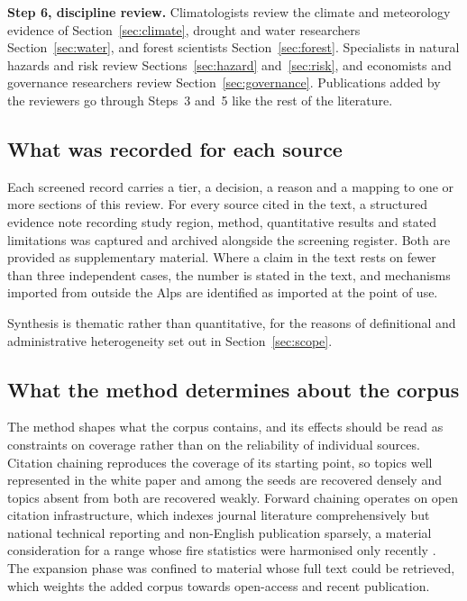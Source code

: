 \documentclass[11pt,a4paper]{article}
\begin{document}
\textbf{Step 6, discipline review.} Climatologists review the climate and meteorology evidence of Section~\ref{sec:climate}, drought and water researchers Section~\ref{sec:water}, and forest scientists Section~\ref{sec:forest}. Specialists in natural hazards and risk review Sections~\ref{sec:hazard} and~\ref{sec:risk}, and economists and governance researchers review Section~\ref{sec:governance}. Publications added by the reviewers go through Steps~3 and~5 like the rest of the literature.

\subsection{What was recorded for each source}
\label{app:recorded}

Each screened record carries a tier, a decision, a reason and a mapping to one or more sections of this review. For every source cited in the text, a structured evidence note recording study region, method, quantitative results and stated limitations was captured and archived alongside the screening register. Both are provided as supplementary material. Where a claim in the text rests on fewer than three independent cases, the number is stated in the text, and mechanisms imported from outside the Alps are identified as imported at the point of use.

Synthesis is thematic rather than quantitative, for the reasons of definitional and administrative heterogeneity set out in Section~\ref{sec:scope}.

\subsection{What the method determines about the corpus}

The method shapes what the corpus contains, and its effects should be read as constraints on coverage rather than on the reliability of individual sources. Citation chaining reproduces the coverage of its starting point, so topics well represented in the white paper and among the seeds are recovered densely and topics absent from both are recovered weakly. Forward chaining operates on open citation infrastructure, which indexes journal literature comprehensively but national technical reporting and non-English publication sparsely, a material consideration for a range whose fire statistics were harmonised only recently \citep{valese_wildfires_2011}. The expansion phase was confined to material whose full text could be retrieved, which weights the added corpus towards open-access and recent publication.
\end{document}
